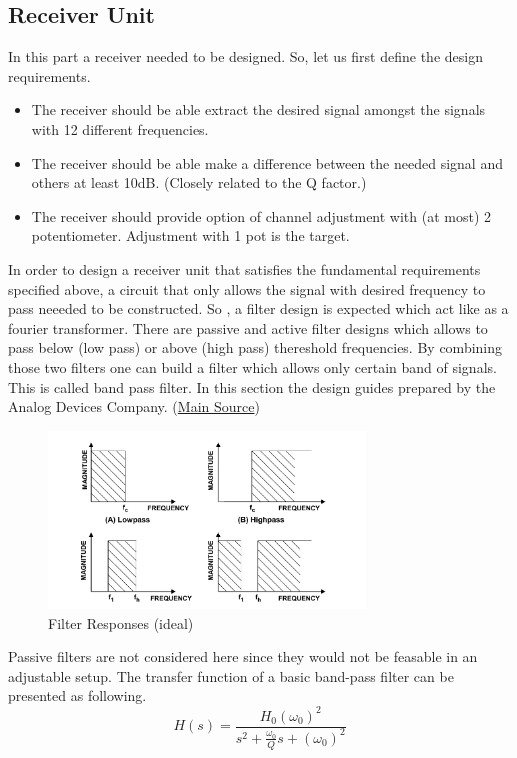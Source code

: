 \documentclass[letterpaper,12pt]{article}
\begin{document}
\subsection{Receiver Unit}
In this part a receiver needed to be designed. So, let us first define the design requirements.
\begin{itemize}
    \item The receiver should be able extract the desired signal amongst the signals with 12 different frequencies.
    \item The receiver should be able make a difference between the needed signal and others at least 10dB. (Closely related to the Q factor.)
    \item The receiver should provide option of channel adjustment with (at most) 2 potentiometer. Adjustment with 1 pot is the target. 
\end{itemize}
In order to design a receiver unit that satisfies the fundamental requirements specified above, a circuit that only allows the signal with desired frequency to pass neeeded to be constructed. So , a filter design is expected which act like as a fourier transformer. There are passive and active filter designs which allows to pass below (low pass) or above (high pass) thereshold frequencies. By combining those two filters one can build a filter which allows only certain band of signals. This is called band pass filter. In this  section the design guides prepared by the Analog Devices Company. (\href{https://www.analog.com/media/en/training-seminars/design-handbooks/basic-linear-design/chapter8.pdf}{Main Source})
\begin{figure}[H]
    \centering
    \includegraphics[width = 0.75\textwidth]{bandpass.png}
    \caption{Filter Responses (ideal)}
\end{figure} 
Passive filters are not considered here since they would not be feasable in an adjustable setup. The transfer function of a basic band-pass filter can be presented as following. 
\[
H(s) = \frac{H_0 (\omega_0)^2}{s^2 + \frac{\omega_0}{Q} s  + (\omega_0)^2}    
\]
\end{document}
